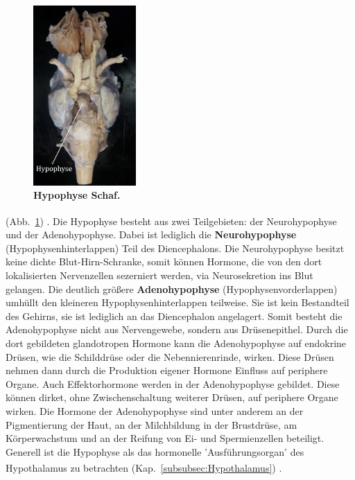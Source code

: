 \documentclass[12pt,a4paper,pdftex]{article}
\begin{document}
\begin{figure}
    \centering
    \includegraphics[width=0.35\textwidth]{pictures/Bilder_Jule/Schaf/Aussenansicht/Hypophyse.png}
    \caption[Hypophyse Schaf.]{\textbf{Hypophyse Schaf.}}
    \label{fig:hypophyse}
\end{figure}

\noindent (Abb.~\ref{fig:hypophyse}) \textsuperscript{\cite[4]{trepel2011neuroanatomie}}. Die Hypophyse besteht aus zwei Teilgebieten: der Neurohypophyse und der Adenohypophyse. Dabei ist lediglich die \textbf{Neurohypophyse} (Hypophysenhinterlappen) Teil des Diencephalons. Die Neurohypophyse besitzt keine dichte Blut-Hirn-Schranke, somit können Hormone, die von den dort lokalisierten Nervenzellen sezerniert werden, via Neurosekretion ins Blut gelangen. Die deutlich größere \textbf{Adenohypophyse} (Hypophysenvorderlappen) umhüllt den kleineren Hypophysenhinterlappen teilweise. Sie ist kein Bestandteil des Gehirns, sie ist lediglich an das Diencephalon angelagert. Somit besteht die Adenohypophyse nicht aus Nervengewebe, sondern aus Drüsenepithel. Durch die dort gebildeten glandotropen Hormone kann die Adenohypophyse auf endokrine Drüsen, wie die Schilddrüse oder die Nebennierenrinde, wirken. Diese Drüsen nehmen dann durch die Produktion eigener Hormone  Einfluss auf periphere Organe. Auch Effektorhormone werden in der Adenohypophyse gebildet. Diese können dirket, ohne Zwischenschaltung weiterer Drüsen, auf periphere Organe wirken. Die Hormone der Adenohypophyse sind unter anderem an der Pigmentierung der Haut, an der Milchbildung in der Brustdrüse, am Körperwachstum und an der Reifung von Ei- und Spermienzellen beteiligt. Generell ist die Hypophyse als das hormonelle 'Ausführungsorgan' des Hypothalamus zu betrachten (Kap.~\ref{subsubsec:Hypothalamus}) \textsuperscript{\cite[8]{trepel2011neuroanatomie}}.
\end{document}
